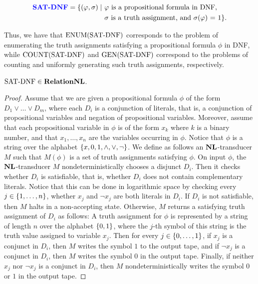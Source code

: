 \documentclass[11pt,twoside=off,numbers=noenddot]{scrbook}
\begin{document}
\begin{definition}
    \begin{align*}
        \textbf{\color{blue} \text{SAT-DNF}} = \{(\varphi, \sigma) \mid & \ \text{$\varphi$ is a propositional formula in DNF,}                 \\
                                                & \ \text{$\sigma$ is a truth assignment, and $\sigma(\varphi)$ = 1}\}.
    \end{align*}
\end{definition} 

Thus, we have that $\text{ENUM}(\text{SAT-DNF})$ corresponds to the problem of enumerating the truth assignments satisfying a propositional formula $\phi$ in DNF, while $\text{COUNT}(\text{SAT-DNF})$ and $\text{GEN}(\text{SAT-DNF})$ correspond to the problems of counting and uniformly generating such truth assignments, respectively.

\begin{lemma}
    $\text{SAT-DNF} \in \textbf{RelationNL}$.
\end{lemma}

\begin{proof}
    Assume that we are given a propositional formula $\phi$ of the form $D_1 \vee \dots \vee D_m$, where each $D_i$ is a conjunction of literals, that is, a conjunction of propositional variables and negation of propositional variables. Moreover, assume that each propositional variable in $\phi$ is of the form $x_k$ where $k$ is a binary number, and that $x_1, \dots, x_n$ are the variables occurring in $\phi$. Notice that $\phi$ is a string over the alphabet $\{ x, 0, 1, \wedge, \vee, \neg \}$. We define as follows an $\textbf{NL}$-transducer $M$ such that $M(\phi)$ is a set of truth assignments satisfying $\phi$. On input $\phi$, the $\textbf{NL}$-transducer $M$ nondeterministically chooses a disjunct $D_i$.  Then it checks whether $D_i$ is satisfiable, that is, whether $D_i$ does not contain complementary literals. Notice that this can be done in logarithmic space by checking every $j \in \{ 1, \dots, n \}$, whether $x_j$ and $\neg x_j$ are both literals in $D_i$. If $D_i$ is not satisfiable, then $M$ halts in a non-accepting state. Otherwise, $M$ returns a satisfying truth assignment of $D_i$ as follows: A truth assignment for $\phi$ is represented by a string of length $n$ over the alphabet $\{ 0, 1 \}$, where the $j$-th symbol of this string is the truth value assigned to variable $x_j$. Then for every $j \in \{ 0, \dots, 1 \}$, if $x_j$ is a conjunct in $D_i$, then $M$ writes the symbol $1$ to the output tape, and if $\neg x_j$ is a conjunct in $D_i$, then $M$ writes the symbol $0$ in the output tape. Finally, if neither $x_j$ nor $\neg x_j$ is a conjunct in $D_i$, then $M$ nondeterministically writes the symbol $0$ or $1$ in the output tape.
\end{proof}
\end{document}
